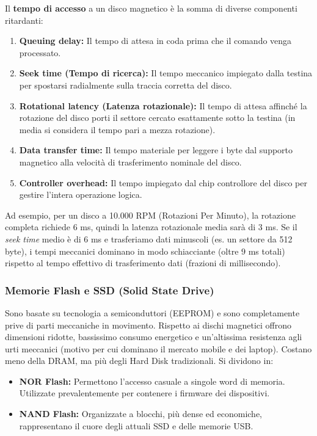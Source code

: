 \documentclass[12pt, a4paper]{article}
\begin{document}
Il \textbf{tempo di accesso} a un disco magnetico è la somma di diverse componenti ritardanti:
\begin{enumerate}
    \item \textbf{Queuing delay:} Il tempo di attesa in coda prima che il comando venga processato.
    \item \textbf{Seek time (Tempo di ricerca):} Il tempo meccanico impiegato dalla testina per spostarsi radialmente sulla traccia corretta del disco.
    \item \textbf{Rotational latency (Latenza rotazionale):} Il tempo di attesa affinché la rotazione del disco porti il settore cercato esattamente sotto la testina (in media si considera il tempo pari a mezza rotazione).
    \item \textbf{Data transfer time:} Il tempo materiale per leggere i byte dal supporto magnetico alla velocità di trasferimento nominale del disco.
    \item \textbf{Controller overhead:} Il tempo impiegato dal chip controllore del disco per gestire l'intera operazione logica.
\end{enumerate}
Ad esempio, per un disco a 10.000 RPM (Rotazioni Per Minuto), la rotazione completa richiede $6$ ms, quindi la latenza rotazionale media sarà di $3$ ms. Se il \textit{seek time} medio è di $6$ ms e trasferiamo dati minuscoli (es. un settore da 512 byte), i tempi meccanici dominano in modo schiacciante (oltre $9$ ms totali) rispetto al tempo effettivo di trasferimento dati (frazioni di millisecondo).

\subsubsection{Memorie Flash e SSD (Solid State Drive)}
Sono basate su tecnologia a semiconduttori (EEPROM) e sono completamente prive di parti meccaniche in movimento. 
Rispetto ai dischi magnetici offrono dimensioni ridotte, bassissimo consumo energetico e un'altissima resistenza agli urti meccanici (motivo per cui dominano il mercato mobile e dei laptop). Costano meno della DRAM, ma più degli Hard Disk tradizionali. Si dividono in:
\begin{itemize}
    \item \textbf{NOR Flash:} Permettono l'accesso casuale a singole word di memoria. Utilizzate prevalentemente per contenere i firmware dei dispositivi.
    \item \textbf{NAND Flash:} Organizzate a blocchi, più dense ed economiche, rappresentano il cuore degli attuali SSD e delle memorie USB.
\end{itemize}
\end{document}
